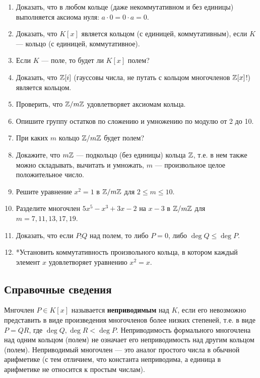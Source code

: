 \begin{enumerate}
\item Доказать, что в любом кольце (даже некоммутативном и без единицы) выполняется аксиома нуля: $a\cdot 0=0\cdot a=0$.
\item Доказать, что $K[x]$ является кольцом (с единицей, коммутативным), если $K$ --- кольцо (с единицей, коммутативное).
\item Если $K$ --- поле, то будет ли $K[x]$ полем?
\item Доказать, что $\mathbb Z[i]$ (гауссовы числа, не путать с кольцом многочленов $\mathbb Z[x]$!) является кольцом.
\item Проверить, что $\mathbb Z/m\mathbb Z$ удовлетворяет аксиомам кольца.
\item Опишите группу остатков по сложению и умножению по модулю от 2 до 10.
\item При каких $m$ кольцо $\mathbb Z/m\mathbb Z$ будет полем?
\item Докажите, что $m\mathbb Z$ --- подкольцо (без единицы) кольца $\mathbb Z$, т.е. в нем также можно складывать, вычитать и умножать, $m$ --- произвольное целое положительное число.
\item Решите уравнение $x^2 = 1$ в $\mathbb Z/m\mathbb Z$ для $2 \le m \le 10$.
\item Разделите многочлен $5x^5 - x^3 + 3x - 2$ на $x - 3$ в $\mathbb Z/m\mathbb Z$ для
$m = 7, 11, 13, 17, 19$.
\item Доказать, что если $P\vdots Q$ над полем, то либо $P=0$, либо $\deg Q\le \deg P$.
\item *Установить коммутативность произвольного кольца, в котором каждый элемент $x$ удовлетворяет уравнению $x^2=x$.

\end{enumerate}

\subsection*{Справочные сведения}

Мнгочлен $P\in K[x]$ называется \textbf{неприводимым} над $K$, если его невозможно представить в виде произведения многочленов более низких степеней, т.е. в виде $P=QR$, где $\deg Q,\deg R<\deg P$. Неприводимость формального многочлена над одним кольцом (полем) не означает его неприводимость над другим кольцом (полем). Неприводимый многочлен --- это аналог простого числа в обычной арифметике (с тем отличием, что константа неприводима, а единица в арифметике не относится к простым числам).

